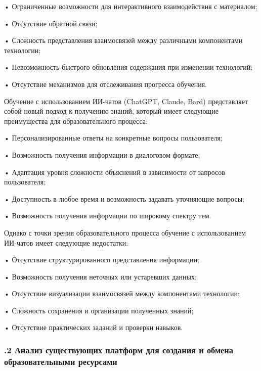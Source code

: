 {  \par \redline • Ограниченные возможности для интерактивного взаимодействия с материалом;
  \par \redline • Отсутствие обратной связи;
  \par \redline • Сложность представления взаимосвязей между различными компонентами технологии;
  \par \redline • Невозможность быстрого обновления содержания при изменении технологий;
  \par \redline • Отсутствие механизмов для отслеживания прогресса обучения.

  \par \redline Обучение с использованием ИИ-чатов (ChatGPT, Claude, Bard) представляет собой новый подход к получению знаний, который имеет следующие преимущества для образовательного процесса:
  
  \par \redline • Персонализированные ответы на конкретные вопросы пользователя;
  \par \redline • Возможность получения информации в диалоговом формате;
  \par \redline • Адаптация уровня сложности объяснений в зависимости от запросов пользователя;
  \par \redline • Доступность в любое время и возможность задавать уточняющие вопросы;
  \par \redline • Возможность получения информации по широкому спектру тем.
  
  \par \redline Однако с точки зрения образовательного процесса обучение с использованием ИИ-чатов имеет следующие недостатки:
  
  \par \redline • Отсутствие структурированного представления информации;
  \par \redline • Возможность получения неточных или устаревших данных;
  \par \redline • Отсутствие визуализации взаимосвязей между компонентами технологии;
  \par \redline • Сложность сохранения и организации полученных знаний;
  \par \redline • Отсутствие практических заданий и проверки навыков.

  \par
}

\subtitlespace

\subsubsection*{ 
  \gostTitleFont
  .2 Анализ существующих платформ для создания и обмена образовательными ресурсами
} 

